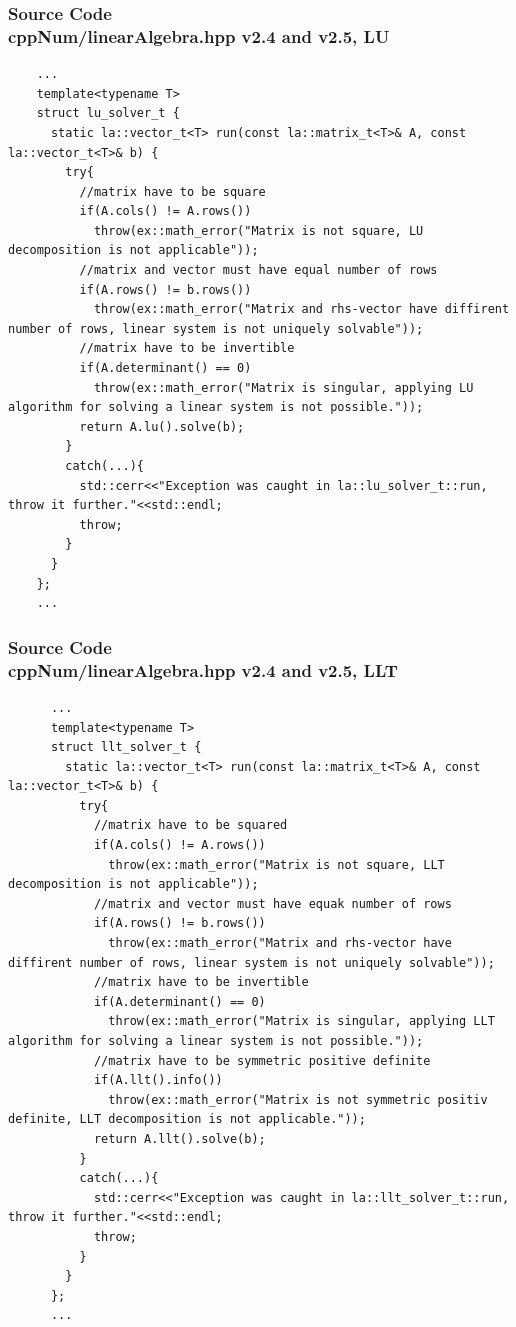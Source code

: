 \documentclass[ucs,10pt]{beamer}
\begin{document}
\begin{frame}[fragile]
\frametitle{Source Code \\
        \small \color{rwth-blue} cppNum/linearAlgebra.hpp v2.4 and v2.5, LU }
	\begin{lstlisting}
	...
	template<typename T>
	struct lu_solver_t {
	  static la::vector_t<T> run(const la::matrix_t<T>& A, const la::vector_t<T>& b) {
	    try{
	      //matrix have to be square
	      if(A.cols() != A.rows())
	        throw(ex::math_error("Matrix is not square, LU decomposition is not applicable"));
	      //matrix and vector must have equal number of rows
	      if(A.rows() != b.rows())
	        throw(ex::math_error("Matrix and rhs-vector have diffirent number of rows, linear system is not uniquely solvable"));
	      //matrix have to be invertible
	      if(A.determinant() == 0)
	        throw(ex::math_error("Matrix is singular, applying LU algorithm for solving a linear system is not possible."));
	      return A.lu().solve(b);
	    }
	    catch(...){
	      std::cerr<<"Exception was caught in la::lu_solver_t::run, throw it further."<<std::endl;
	      throw;
	    }
	  }
  	};
	...
	\end{lstlisting}
\end{frame}

\begin{frame}[fragile]
\frametitle{Source Code \\
        \small \color{rwth-blue} cppNum/linearAlgebra.hpp v2.4 and v2.5, LLT }
	\begin{lstlisting}
	  ...
	  template<typename T>
	  struct llt_solver_t {
	    static la::vector_t<T> run(const la::matrix_t<T>& A, const la::vector_t<T>& b) {
	      try{
	        //matrix have to be squared
	        if(A.cols() != A.rows())
	          throw(ex::math_error("Matrix is not square, LLT decomposition is not applicable"));
	        //matrix and vector must have equak number of rows
	        if(A.rows() != b.rows())
	          throw(ex::math_error("Matrix and rhs-vector have diffirent number of rows, linear system is not uniquely solvable"));
	        //matrix have to be invertible
	        if(A.determinant() == 0)
	          throw(ex::math_error("Matrix is singular, applying LLT algorithm for solving a linear system is not possible."));
	        //matrix have to be symmetric positive definite
	        if(A.llt().info())
	          throw(ex::math_error("Matrix is not symmetric positiv definite, LLT decomposition is not applicable."));
	        return A.llt().solve(b);
	      }
	      catch(...){
	        std::cerr<<"Exception was caught in la::llt_solver_t::run, throw it further."<<std::endl;
	        throw;
	      }
	    }
  	  };
	  ...
        \end{lstlisting}
\end{frame}
\end{document}
